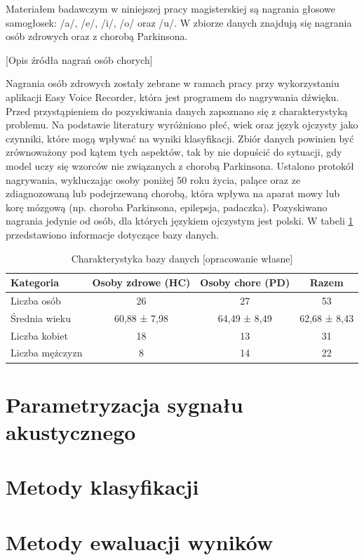 Materiałem badawczym w niniejszej pracy magisterskiej są nagrania głosowe samogłosek: /a/,
/e/, /i/, /o/ oraz /u/. W zbiorze danych znajdują się nagrania osób zdrowych oraz z chorobą
Parkinsona.

[Opis źródła nagrań osób chorych]

Nagrania osób zdrowych zostały zebrane w ramach pracy przy wykorzystaniu aplikacji Easy
Voice Recorder, która jest programem do nagrywania dźwięku. Przed przystąpieniem do pozyskiwania
danych zapoznano się z charakterystyką problemu. Na podstawie literatury wyróżniono płeć, wiek oraz
język ojczysty jako czynniki, które mogą wpływać na wyniki klasyfikacji. Zbiór danych powinien być
zrównoważony pod kątem tych aspektów, tak by nie dopuścić do sytuacji, gdy model uczy się wzorców
nie związanych z chorobą Parkinsona.
Ustalono protokół nagrywania, wykluczając osoby poniżej 50 roku życia, palące oraz ze
zdiagnozowaną lub podejrzewaną chorobą, która wpływa na aparat mowy lub korę mózgową (np.
choroba Parkinsona, epilepsja, padaczka). Pozyskiwano nagrania jedynie od osób, dla których językiem
ojczystym jest polski. W tabeli \ref{tab:charakterystyka-bazy-danych} przedstawiono informacje dotyczące bazy danych.


\begin{table}[t]
\centering
\caption{Charakterystyka bazy danych [opracowanie własne]}
\label{tab:charakterystyka-bazy-danych}
\begin{tabular}{|l|c|c|c|}
\hline
\textbf{Kategoria} &\textbf{Osoby zdrowe (HC)} &\textbf{Osoby chore (PD)} &\textbf{Razem} \\ \hline
Liczba osób &26 &27 &53\\ \hline
Średnia wieku &60,88 ± 7,98 &64,49 ± 8,49  &62,68 ± 8,43\\ \hline
Liczba kobiet &18 &13 &31\\ \hline
Liczba mężczyzn &8 &14 &22 \\ \hline
\end{tabular}
\end{table}


\section{Parametryzacja sygnału akustycznego}
\label{sec:parametryzacja-sygnalu-akustycznego}


\section{Metody klasyfikacji}
\label{sec:klasyfikacja}


\section{Metody ewaluacji wyników}
\label{sec:metody-ewaluacji-wyników}